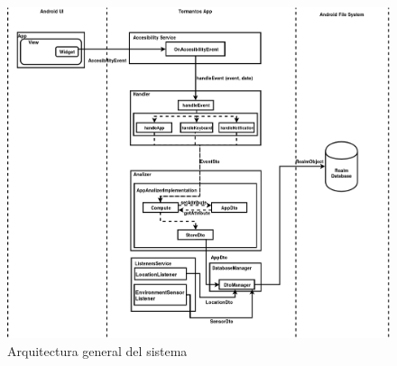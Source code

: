 \documentclass[12pt,a4paper,oneside]{book} %
\begin{document}
\begin{landscape}
\begin{figure}[htb]
	\begin{center}
		\includegraphics[scale=0.45]{pictures/architecture/lowLevel/TFG_ArquitecturaBajoNivel01.png} 
	\end{center}
	\caption[Arquitectura general del sistema]{Arquitectura general del sistema}
\end{figure}
\end{landscape}
\end{document}
